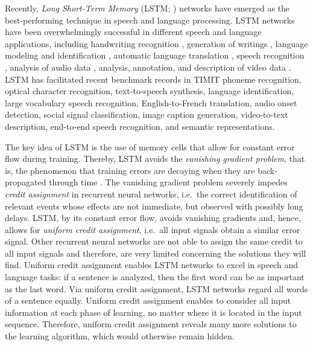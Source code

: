 \documentclass[runningheads]{llncs}
\begin{document}
Recently, {\em Long Short-Term Memory} (LSTM; \cite{Arr:Hochreiter:91,Arr:Hochreiter:95,Arr:Hochreiter:97})
networks have emerged as the best-performing technique in speech and language processing.
LSTM networks have been overwhelmingly successful in different speech and language applications,
including handwriting recognition \cite{Arr:Graves:09}, 
generation of writings \cite{Arr:Graves:14arxivb},
language modeling and identification \cite{Arr:Gonzalez-Dominguez:14,Arr:Zaremba:14arxiva},
automatic language translation \cite{Arr:Sutskever:14nips}, 
speech recognition \cite{Arr:Sak:14,Arr:Geiger:14},
analysis of audio data \cite{Arr:Marchi:14}, analysis, annotation, and
description of video data \cite{Arr:Donahue:14,Arr:Venugopalan:14,Arr:Srivastava:15}. 
LSTM has facilitated recent benchmark records in TIMIT phoneme recognition,
optical character recognition, text-to-speech synthesis,
language identification, large vocabulary speech recognition,
English-to-French translation, audio onset detection, social signal classification,
image caption generation, video-to-text description, end-to-end speech recognition,
and semantic representations.

The key idea of LSTM is the use of memory cells that allow for constant error flow
during training. Thereby, LSTM avoids the {\em vanishing gradient problem}, that is,
the phenomenon that training errors are decaying when they are back-propagated through time
\cite{Arr:Hochreiter:91,Arr:Hochreiter:00}.
The vanishing gradient problem severely impedes {\em credit assignment} in recurrent neural
networks, i.e.\ the correct identification of relevant events whose effects are not
immediate, but observed with possibly long delays.
LSTM, by its constant error flow, avoids vanishing gradients and, hence, allows for
{\em uniform credit assignment}, i.e.\ all input signals obtain a similar error signal.
Other recurrent neural networks are not able to assign the same credit 
to all input signals and therefore, 
are very limited concerning the solutions they will
find. Uniform credit assignment enables LSTM networks to excel in speech and
language tasks: if a sentence is analyzed, then the first word can be as important as
the last word. Via uniform credit assignment, LSTM networks regard all words of a sentence equally.
Uniform credit assignment enables to consider all input information
at each phase of learning, no matter where it is located in the input
sequence. Therefore, uniform credit assignment reveals many more
solutions to the learning algorithm, which would otherwise remain hidden. 
\end{document}
